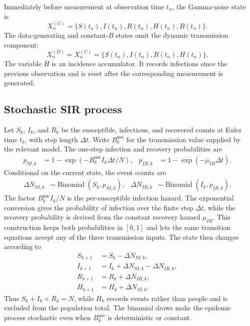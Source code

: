 Immediately before measurement at observation time \(t_n\), the Gamma-noise
state is
\[
X_n^{(G)}
=\{S(t_n),I(t_n),R(t_n),H(t_n),B(t_n)\}.
\]
The data-generating and constant-\(B\) states omit the dynamic transmission
component:
\[
X_n^{(D)}=X_n^{(C)}
=\{S(t_n),I(t_n),R(t_n),H(t_n)\}.
\]
The variable \(H\) is an incidence accumulator.  It records infections since
the previous observation and is reset after the corresponding measurement is
generated.

\subsection{Stochastic SIR process}

Let \(S_k\), \(I_k\), and \(R_k\) be the susceptible, infectious, and recovered
counts at Euler time \(t_k\), with step length \(\Delta t\).  Write
\(B_k^{\mathrm{use}}\) for the transmission value supplied by the relevant
model.  The one-step infection and recovery probabilities are
\begin{align}
p_{SI,k}
&=1-\exp\left(-B_k^{\mathrm{use}}I_k\Delta t/N\right),&
p_{IR,k}
&=1-\exp\left(-\mu_{IR}\Delta t\right).
\end{align}
Conditional on the current state, the event counts are
\begin{align}
\Delta N_{SI,k}
&\sim\operatorname{Binomial}(S_k,p_{SI,k}),&
\Delta N_{IR,k}
&\sim\operatorname{Binomial}(I_k,p_{IR,k}).
\end{align}
The factor \(B_k^{\mathrm{use}}I_k/N\) is the per-susceptible infection
hazard.  The exponential conversion gives the probability of infection over
the finite step \(\Delta t\), while the recovery probability is derived from
the constant recovery hazard \(\mu_{IR}\).  This construction keeps both
probabilities in \([0,1]\) and lets the same transition equations accept any
of the three transmission inputs.
The state then changes according to
\begin{align}
S_{k+1} &= S_k-\Delta N_{SI,k},\\
I_{k+1} &= I_k+\Delta N_{SI,k}-\Delta N_{IR,k},\\
R_{k+1} &= R_k+\Delta N_{IR,k},\\
H_{k+1} &= H_k+\Delta N_{SI,k}.
\end{align}
Thus \(S_k+I_k+R_k=N\), while \(H_k\) records events rather than people and is
excluded from the population total.  The binomial draws make the epidemic
process stochastic even when \(B_k^{\mathrm{use}}\) is deterministic or
constant.

